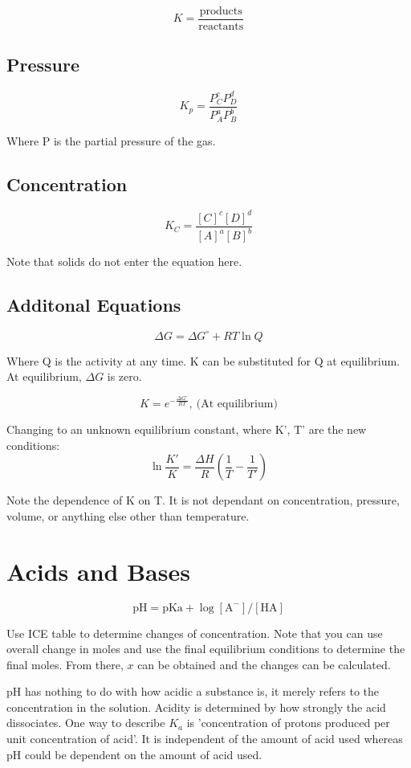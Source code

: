 \documentclass{article}
\begin{document}
\[
K = \frac{\text{products}}{\text{reactants}}
\]

\subsection{Pressure}

\[
K_p= \frac{P_C^c P_D^d}{P_A^a P_B^b}
\]

Where P is the partial pressure of the gas.

\subsection{Concentration}

\[
K_C = \frac{[C]^c [D]^d}{[A]^a [B]^b}
\]

Note that solids do not enter the equation here.

\subsection{Additonal Equations}
\[
\Delta G = \Delta G^{\circ} + RT \ln Q
\]

Where Q is the activity at any time. K can be substituted for Q at equilibrium. At equilibrium, $\Delta G$ is zero.

\[
K = e^{-\frac{\Delta G^{\circ}}{RT}},\ \text{(At equilibrium)}
\]


Changing to an unknown equilibrium constant, where K', T' are the new conditions:
\[
\ln \frac{K'}{K} = \frac{\Delta H}{R} (\frac{1}{T} - \frac{1}{T'})
\]

Note the dependence of K on T. It is not dependant on concentration, pressure, volume, or anything else other than temperature.

\section{Acids and Bases}

\[
\text{pH} = \text{pKa} + \log[\text{A}^-]/[\text{HA}]
\]

Use ICE table to determine changes of concentration. Note that you can use overall change in moles and use the final equilibrium conditions to determine the final moles. From there, $x$ can be obtained and the changes can be calculated.

pH has nothing to do with how acidic a substance is, it merely refers to the concentration in the solution. Acidity is determined by how strongly the acid dissociates. One way to describe $K_a$ is 'concentration of protons produced per unit concentration of acid'. It is independent of the amount of acid used whereas pH could be dependent on the amount of acid used.
\end{document}
